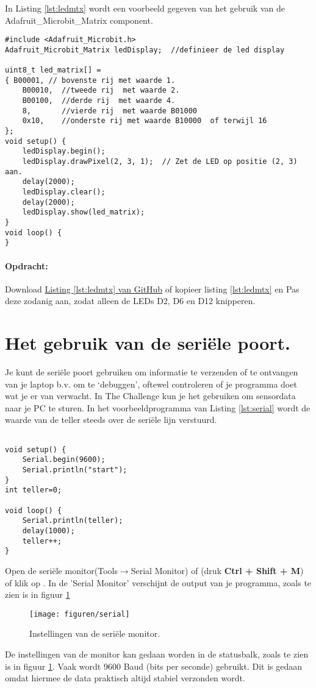 In Listing \ref{lst:ledmtx} wordt een voorbeeld gegeven van het gebruik van de Adafruit\_Microbit\_Matrix component.

\begin{lstlisting}[caption= Een LED matrix demo,label={lst:ledmtx},firstnumber=1]		
#include <Adafruit_Microbit.h>
Adafruit_Microbit_Matrix ledDisplay;  //definieer de led display

uint8_t led_matrix[] =
{ B00001, // bovenste rij met waarde 1.
	B00010,  //tweede rij  met waarde 2.
	B00100,  //derde rij  met waarde 4.
	8,       //vierde rij  met waarde B01000
	0x10,    //onderste rij met waarde B10000  of terwijl 16
};
void setup() {
	ledDisplay.begin(); 
	ledDisplay.drawPixel(2, 3, 1);  // Zet de LED op positie (2, 3) aan.
	delay(2000);  
	ledDisplay.clear();  
	delay(2000);  
	ledDisplay.show(led_matrix);
}
void loop() {
}
\end{lstlisting}

\paragraph{Opdracht: }Download  \href{https://github.com/JohnVi-hhs/embsysP/tree/main/voorbeelden/matrixOpdracht.ino}{ Listing \ref{lst:ledmtx} van GitHub} of kopieer listing \ref{lst:ledmtx} en 
Pas deze zodanig aan, zodat alleen de LEDs D2, D6 en D12 knipperen.\label{blz:opdrmLEDSmatrix}


\section{Het gebruik van de seriële poort.}

Je kunt de seriële poort gebruiken om informatie te verzenden of te ontvangen van je laptop b.v. om te ‘debuggen’, oftewel controleren of je programma doet wat je er van verwacht. In The Challenge kun je het gebruiken om sensordata naar je PC te sturen. In het voorbeeldprogramma van Listing \ref{lst:serial} wordt de waarde van de teller steeds over de seriële lijn verstuurd.

\begin{lstlisting}[caption= Een LED matrix demo,label={lst:serial},firstnumber=1]		
	
void setup() {
	Serial.begin(9600);
	Serial.println("start");
}
int teller=0;

void loop() {
	Serial.println(teller);
	delay(1000);
	teller++;
}
\end{lstlisting}


Open de seriële monitor(Tools$\rightarrow$Serial Monitor) of (druk \colorbox{mygray}{\textbf{Ctrl + Shift + M}}) of klik op . In de 'Serial Monitor' verschijnt de output van je programma, zoals te zien is in figuur \ref{fig:arser}
\begin{figure}[H]
	\captionsetup{justification=centering}
	\texttt{[image: figuren/serial]}
	\centering
	\caption{Instellingen van de seriële monitor.}
	\label{fig:arser}
\end{figure}
De instellingen van de monitor kan gedaan worden in de statusbalk, zoals te zien is in figuur \ref{fig:arser}.
Vaak wordt 9600 Baud (bits per seconde) gebruikt. Dit is gedaan omdat hiermee de data praktisch altijd stabiel verzonden wordt.

